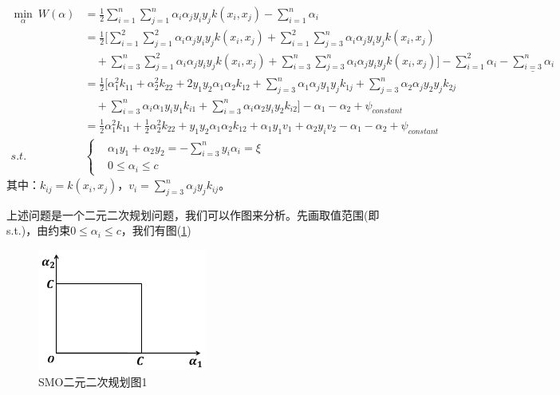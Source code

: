         \begin{align*}
        \min_\alpha \ W(\alpha)&= \frac{1}{2} \sum_{i=1}^n\sum_{j=1}^n\alpha_i\alpha_jy_iy_j k(x_i,x_j) - \sum_{i=1}^n\alpha_i\\
        &= \frac{1}{2} \bigg[ \sum_{i=1}^2\sum_{j=1}^2 \alpha_i\alpha_jy_iy_j k(x_i,x_j) +  \sum_{i=1}^2\sum_{j=3}^n \alpha_i\alpha_jy_iy_j k(x_i,x_j) \\
        & \quad + \sum_{i=3}^n\sum_{j=1}^2 \alpha_i\alpha_jy_iy_j k(x_i,x_j) +  \sum_{i=3}^n\sum_{j=3}^n \alpha_i\alpha_jy_iy_j k(x_i,x_j)\bigg] - \sum_{i=1}^2 \alpha_i - \underline{\sum_{i=3}^n\alpha_i}\\
        &=\frac{1}{2}\bigg[ \alpha_1^2k_{11}+\alpha_2^2k_{22}+2y_1y_2\alpha_1\alpha_2k_{12}+\sum_{j=3}^n\alpha_1\alpha_jy_1y_jk_{1j}+ \sum_{j=3}^n\alpha_2\alpha_jy_2y_jk_{2j}\\
        &\quad + \sum_{i=3}^n \alpha_i \alpha_1y_iy_1k_{i1}+\sum_{i=3}^n\alpha_i\alpha_2y_iy_2k_{i2}\bigg] - \alpha_1-\alpha_2+\psi_{constant}\\
        &= \frac{1}{2}\alpha_1^2k_{11}+\frac{1}{2}\alpha_2^2k_{22}+y_1y_2\alpha_1\alpha_2k_{12}+\alpha_1y_1v_1+\alpha_2y_iv_2-\alpha_1-\alpha_2+\psi_{constant}\\
        s.t.\quad &\left\{
        \begin{aligned}
        & \alpha_1y_1+\alpha_2y_2 = -\sum_{i=3}^ny_i\alpha_i = \xi\\
        & 0 \leqslant \alpha_i \leqslant c
        \end{aligned}
        \right.
        \end{align*}
        其中：$k_{ij} = k(x_i,x_j)$，$v_i = \sum_{j=3}^n\alpha_jy_jk_{ij}$。
        \par
        上述问题是一个二元二次规划问题，我们可以作图来分析。先画取值范围(即s.t.)，由约束$0 \leqslant \alpha_i \leqslant c$，我们有图(\ref{SMO二元二次规划图1})
            \begin{figure}[H]
            \centering
            \includegraphics[height=4cm]{images/SMOBinary_quadratic_programming.jpg}
            \caption{SMO二元二次规划图1}
            \label{SMO二元二次规划图1}
            \end{figure}
